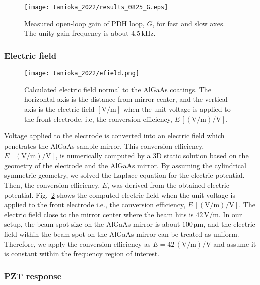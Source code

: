 \begin{figure}[htbp]
    \centering
\texttt{[image: tanioka\_2022/results\_0825\_G.eps]}
\caption{
Measured open-loop gain of PDH loop, $G$, for fast and slow axes. The unity gain frequency is about $4.5\, \mathrm{kHz}$.
}
\label{fig.rawOLG}
\end{figure}

\subsubsection{Electric field}

\begin{figure}[htbp]
    \centering
\texttt{[image: tanioka\_2022/efield.png]}
\caption{
Calculated electric field normal to the AlGaAs coatings.
The horizontal axis is the distance from mirror center, and the vertical axis is the electric field $\mathrm{[V/m]}$ when the unit voltage is applied to the front electrode, i.e, the conversion efficiency, $E\, \mathrm{[(V/m)/V]}$.
}
\label{fig.efield}
\end{figure}

Voltage applied to the electrode is converted into an electric field which penetrates the AlGaAs sample mirror.
This conversion efficiency, $E\, \mathrm{[(V/m)/V]}$, is numerically computed by a 3D static solution based on the geometry of the electrode and the AlGaAs mirror.
By assuming the cylindrical symmetric geometry, we solved the Laplace equation for the electric potential.
Then, the conversion efficiency, $E$, was derived from the obtained electric potential.
Fig.~\ref{fig.efield} shows the computed electric field when the unit voltage is applied to the front electrode i.e., the conversion efficiency, $E\, \mathrm{[(V/m)/V]}$.
The electric field close to the mirror center where the beam hits is $42\, \mathrm{V/m}$.
In our setup, the beam spot size on the AlGaAs mirror is about $100\, \mathrm{\mu m}$, and the electric field within the beam spot on the AlGaAs mirror can be treated as uniform.
Therefore, we apply the conversion efficiency as $E = 42\, \mathrm{(V/m)/V}$ and assume it is constant within the frequency region of interest.

\subsubsection{PZT response}

